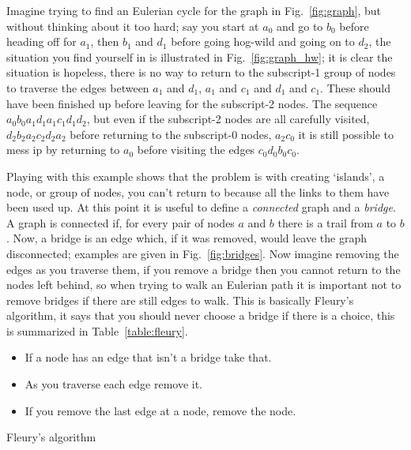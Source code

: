 \documentclass[11pt,a4paper]{scrartcl}
\begin{document}
Imagine trying to find an Eulerian cycle for the graph in
Fig.~\ref{fig:graph}, but without thinking about it too hard; say you
start at $a_0$ and go to $b_0$ before heading off for $a_1$, then
$b_1$ and $d_1$ before going hog-wild and going on to $d_2$, the
situation you find yourself in is illustrated in
Fig.~\ref{fig:graph_hw}; it is clear the situation is hopeless, there
is no way to return to the subscript-1 group of nodes to traverse the
edges between $a_1$ and $d_1$, $a_1$ and $c_1$ and $d_1$ and
$c_1$. These should have been finished up before leaving for the
subscript-2 nodes. The sequence $a_0b_0a_1d_1a_1c_1d_1d_2$, but even
if the subscript-2 nodes are all carefully visited,
$d_2b_2a_2c_2d_2a_2$ before returning to the subscript-0 nodes,
$a_2c_0$ it is still possible to mess ip by returning to $a_0$ before
visiting the edges $c_0d_0b_0c_0$.

Playing with this example shows that the problem is with creating
\lq{}islands\rq{}, a node, or group of nodes, you can't return to
because all the links to them have been used up. At this point it is
useful to define a \textsl{connected} graph and a \textsl{bridge}. A
graph is connected if, for every pair of nodes $a$ and $b$ there is a
trail from $a$ to $b$. Now, a bridge is an edge which, if it was
removed, would leave the graph disconnected; examples are given in
Fig.~\ref{fig:bridges}. Now imagine removing the edges as you traverse
them, if you remove a bridge then you cannot return to the nodes left
behind, so when trying to walk an Eulerian path it is important not to
remove bridges if there are still edges to walk. This is basically
Fleury's algorithm, it says that you should never choose a bridge if
there is a choice, this is summarized in Table~\ref{table:fleury}.

\begin{table}
\begin{itemize}
\item If a node has an edge that isn't a bridge take that.
\item As you traverse each edge remove it.
\item If you remove the last edge at a node, remove the node.
\end{itemize}
\caption{Fleury's algorithm \label{table:fleury}}
\end{table}
  
\end{document}
